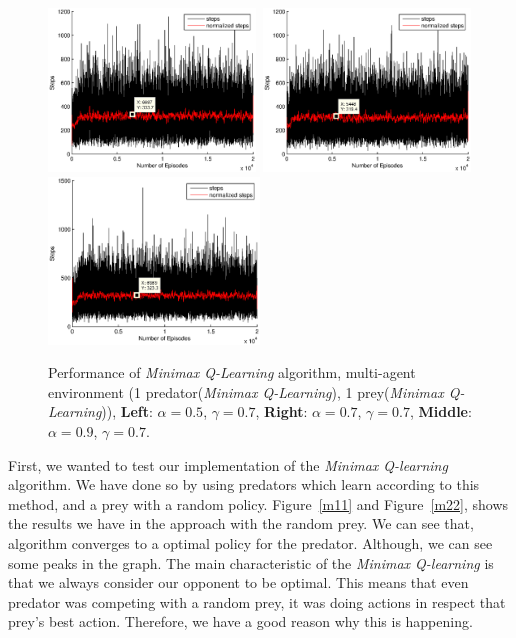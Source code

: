 \documentclass[a4paper,11pt]{article}
\begin{document}
\begin{figure}[ht!]
  \centering
    \includegraphics[width=0.49\textwidth]{figures/mm05.eps}\	
    \includegraphics[width=0.49\textwidth]{figures/mm07.eps}\\
    \includegraphics[width=0.5\textwidth]{figures/mm09.eps}
    \caption{Performance of  \textit{Minimax Q-Learning} algorithm, multi-agent environment (1 predator(\textit{Minimax Q-Learning}), 1 prey(\textit{Minimax Q-Learning})), \textbf{Left}: $\alpha = 0.5$, $\gamma = 0.7$, \textbf{Right}: $\alpha = 0.7$, $\gamma = 0.7$, \textbf{Middle}: $\alpha = 0.9$, $\gamma = 0.7$.}
    \label{m13}
\end{figure}

First, we wanted to test our implementation of the \textit{Minimax Q-learning} algorithm. We have done so by using predators which learn according to this method, and a prey with a random policy. Figure~\ref{m11} and Figure~\ref{m22}, shows the results we have in the approach with the random prey. We can see that, algorithm converges to a optimal policy for the predator. Although, we can see some peaks in the graph. The main characteristic of the \textit{Minimax Q-learning} is that we always consider our opponent to be optimal. This means that even predator was competing with a random prey, it was doing actions in respect that prey's best action. Therefore, we have a good reason why this is happening.
\end{document}
